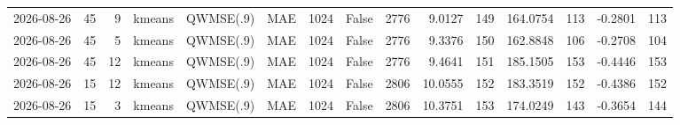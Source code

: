 \documentclass[10pt]{article}
\begin{document}
\begin{landscape}
\begin{longtable}{@{}lrrlllrcrrrrrrr@{}}
2026-08-26 & 45 & 9 & kmeans & QWMSE(.9) & MAE & 1024 & False & 2776 & 9.0127 & 149 & 164.0754 & 113 & -0.2801 & 113 \\
2026-08-26 & 45 & 5 & kmeans & QWMSE(.9) & MAE & 1024 & False & 2776 & 9.3376 & 150 & 162.8848 & 106 & -0.2708 & 104 \\
2026-08-26 & 45 & 12 & kmeans & QWMSE(.9) & MAE & 1024 & False & 2776 & 9.4641 & 151 & 185.1505 & 153 & -0.4446 & 153 \\
2026-08-26 & 15 & 12 & kmeans & QWMSE(.9) & MAE & 1024 & False & 2806 & 10.0555 & 152 & 183.3519 & 152 & -0.4386 & 152 \\
2026-08-26 & 15 & 3 & kmeans & QWMSE(.9) & MAE & 1024 & False & 2806 & 10.3751 & 153 & 174.0249 & 143 & -0.3654 & 144 \\
\bottomrule
\end{longtable}
\clearpage

\end{landscape}
\end{document}
